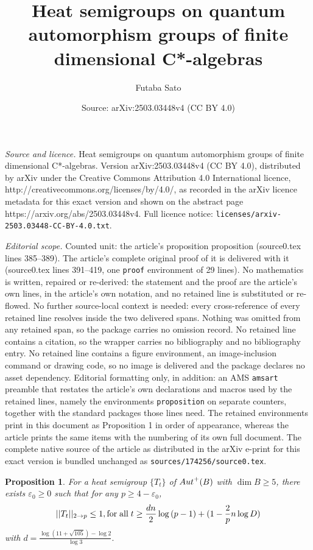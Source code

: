 \documentclass[10pt,a4paper]{amsart}
\title{Heat semigroups on quantum automorphism groups of finite dimensional C*-algebras}
\author{Futaba Sato}
\date{Source: arXiv:2503.03448v4 (CC BY 4.0)}
\newtheorem{proposition}{Proposition}
\begin{document}
\maketitle

\noindent\emph{Source and licence.} Heat semigroups on quantum automorphism groups of finite dimensional C*-algebras. Version arXiv:2503.03448v4 (CC BY 4.0), distributed by arXiv under the Creative Commons Attribution 4.0 International licence, http://creativecommons.org/licenses/by/4.0/, as recorded in the arXiv licence metadata for this exact version and shown on the abstract page https://arxiv.org/abs/2503.03448v4. Full licence notice: \texttt{licenses/arxiv-2503.03448-CC-BY-4.0.txt}.\par\smallskip

\noindent\textit{Editorial scope.} Counted unit: the article's proposition proposition (source0.tex lines 385--389). The article's complete original proof of it is delivered with it (source0.tex lines 391--419, one \texttt{proof} environment of 29 lines). No mathematics is written, repaired or re-derived: the statement and the proof are the article's own lines, in the article's own notation, and no retained line is substituted or re-flowed.  No further source-local context is needed: every cross-reference of every retained line resolves inside the two delivered spans.  Nothing was omitted from any retained span, so the package carries no omission record.  No retained line contains a citation, so the wrapper carries no bibliography and no bibliography entry.  No retained line contains a figure environment, an image-inclusion command or drawing code, so no image is delivered and the package declares no asset dependency.  Editorial formatting only, in addition: an AMS \texttt{amsart} preamble that restates the article's own declarations and macros used by the retained lines, namely the environments \texttt{proposition} on separate counters, together with the standard packages those lines need.  The retained environments print in this document as Proposition 1 in order of appearance, whereas the article prints the same items with the numbering of its own full document.  The complete native source of the article as distributed in the arXiv e-print for this exact version is bundled unchanged as \texttt{sources/174256/source0.tex}.
 \begin{proposition}
 For a heat semigroup $\{T_t\}$ of ${\rm Aut}^+(B)$ with $\dim B\geq5$, there exists $\varepsilon_0\geq0$ such that for any $p\geq4-\varepsilon_0$,
 \[||T_t||_{2\to p}\leq1, \text{for\;all}\;t\geq\frac{dn}{2}\log{(p-1)}+(1-\frac{2}{p}n\log D)\]
 with $d=\frac{\log(11+\sqrt{105})-\log2}{\log3}.$
 \end{proposition}
\end{document}

